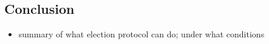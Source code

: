 \subsection{Conclusion} \label{sec: conclusion}

\begin{itemize}
  \item summary of what election protocol can do; under what conditions
\end{itemize}

